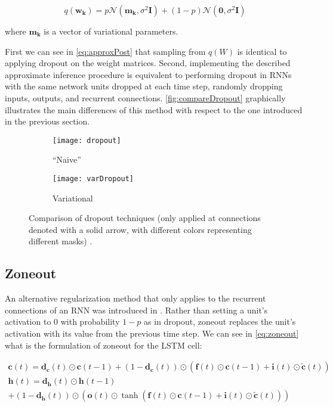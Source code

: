 \begin{equation} \label{eq:approxPost}
	q(\mathbf{w_k})=p\mathcal{N}(\mathbf{m_k},\sigma^2\mathbf{I})+(1-p)\mathcal{N}(\mathbf{0},\sigma^2\mathbf{I})
\end{equation}

where $\mathbf{m_k}$ is a vector of variational parameters.

First we can see in \autoref{eq:approxPost} that sampling from $q(W)$ is identical to applying dropout on the weight matrices. Second, implementing the described approximate inference procedure is equivalent to performing dropout in RNNs with the same network units dropped at each time step, randomly dropping inputs, outputs, and recurrent connections. \autoref{fig:compareDropout} graphically illustrates the main differences of this method with respect to the one introduced in the previous section.

\begin{figure}[H]
	\centering
	\begin{subfigure}{.5\textwidth}
		\centering
		\texttt{[image: dropout]}
		\caption{``Naive''}
		\label{fig:dropout}
	\end{subfigure}%
	\begin{subfigure}{.5\textwidth}
		\centering
		\texttt{[image: varDropout]}
		\caption{Variational}
		\label{fig:varDropout}
	\end{subfigure}
	\caption{Comparison of dropout techniques (only applied at connections denoted with a solid arrow, with different colors representing different masks) \cite{gal2016theoretically}.}
	\label{fig:compareDropout}
\end{figure}

\subsection{Zoneout}

An alternative regularization method that only applies to the recurrent connections of an RNN was introduced in \cite{krueger2016zoneout}. Rather than setting a unit's activation to 0 with probability $1-p$ as in dropout, zoneout replaces the unit's activation with its value from the previous time step. We can see in \autoref{eq:zoneout} what is the formulation of zoneout for the LSTM cell:

\begin{equation} \label{eq:zoneout}
	\begin{gathered}
		\mathbf{c}(t) = \mathbf{d_c}(t)\odot\mathbf{c}(t-1) + (1-\mathbf{d_c}(t))\odot(\mathbf{f}(t) \odot \mathbf{c}(t-1) + \mathbf{i}(t) \odot \mathbf{\tilde{c}}(t)) \\
		\mathbf{h}(t) = \mathbf{d_h}(t)\odot\mathbf{h}(t-1) \\ 
		+ (1-\mathbf{d_h}(t))\odot (\mathbf{o}(t) \odot \tanh(\mathbf{f}(t) \odot \mathbf{c}(t-1) + \mathbf{i}(t) \odot \mathbf{\tilde{c}}(t)))
	\end{gathered}
\end{equation}

